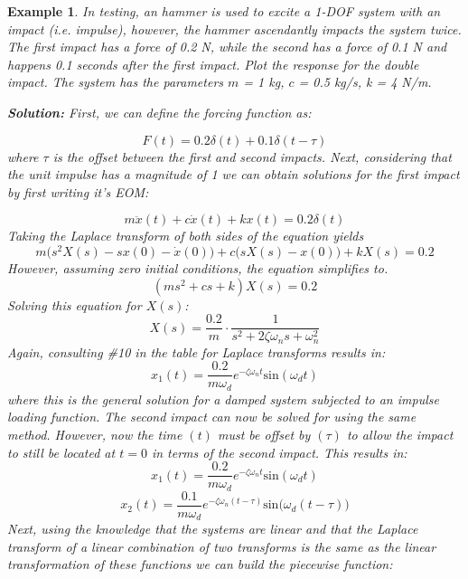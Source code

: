 \documentclass[12pt,letter]{article}
\newtheorem{ex}{Example}
\numberwithin{ex}{section} %
\newenvironment{example}{\begin{mdframed}[middlelinewidth=0.5mm]\begin{ex}\normalfont}{\end{ex}\end{mdframed}}
\numberwithin{re}{section} %
\begin{document}
\begin{example}


In testing, an hammer is used to excite a 1-DOF system with an impact (i.e. impulse), however, the hammer ascendantly impacts the system twice. The first impact has a force of 0.2 N, while the second has a force of 0.1 N and happens 0.1 seconds after the first impact. Plot the response for the double impact. The system has the parameters $m$ = 1 kg, $c$ = 0.5 kg/s, k = 4 N/m. 

\noindent\textbf{Solution:} First, we can define the forcing function as:

\begin{equation}
	F(t) = 0.2 \delta (t) + 0.1 \delta(t-\tau)
\end{equation}
where $\tau$ is the offset between the first and second impacts. Next, considering that the unit impulse has a magnitude of 1 we can obtain solutions for the first impact by first writing it's EOM:

\begin{equation}
m\ddot{x}(t) +c\dot{x}(t) +kx(t) =0.2 \delta(t)
\end{equation}
Taking the Laplace transform of both sides of the equation yields 
\begin{equation}
m\big(s^2X(s)-sx(0) - \dot{x}(0)\big) + c\big(sX(s)-x(0)\big) +kX(s) = 0.2
\end{equation}
However, assuming zero initial conditions, the equation simplifies to. 
\begin{equation}
(ms^2 + cs +k)X(s) = 0.2
\end{equation}
Solving this equation for $X(s)$:
\begin{equation}
X(s) = \frac{0.2}{m} \cdot \frac{1}{s^2 + 2 \zeta \omega_n s + \omega_n^2}
\end{equation}
Again, consulting \#10 in the table for Laplace transforms results in:
\begin{equation}
x_1(t) = \frac{0.2}{m \omega_d} e^{-\zeta \omega_n t} \text{sin}(\omega_dt)
\end{equation}
where this is the general solution for a damped system subjected to an impulse loading function. The second impact can now be solved for using the same method. However, now the time $(t)$ must be offset by $(\tau)$ to allow the impact to still be located at $t=0$ in terms of the second impact. This results in:
\begin{equation}
	x_1(t) = \frac{0.2}{m \omega_d} e^{-\zeta \omega_n t} \text{sin}(\omega_dt)
\end{equation}
\begin{equation}
	x_2(t) = \frac{0.1}{m \omega_d} e^{-\zeta \omega_n (t-\tau)} \text{sin}\big(\omega_d(t-\tau)\big)
\end{equation}
Next, using the knowledge that the systems are linear and that the Laplace transform of a linear combination of two transforms is the same as the linear transformation of these functions we can build the piecewise function:


\end{example}
\end{document}
